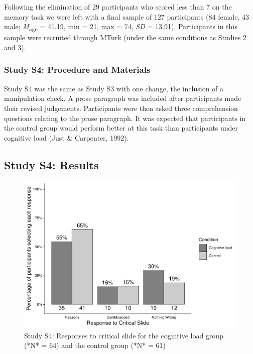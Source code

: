 \documentclass[
  american,
  man,floatsintext]{apa7}
\begin{document}
Following the elimination of 29 participants who scored less than 7 on the memory task we were left with a final sample of 127 participants (84 female, 43 male; \emph{M}\textsubscript{age} = 41.19, min = 21, max = 74, \emph{SD} = 13.91). Participants in this sample were recruited through
MTurk (under the same conditions as Studies 2 and 3).

\hypertarget{study-s4-procedure-and-materials}{%
\subsubsection{Study S4: Procedure and Materials}\label{study-s4-procedure-and-materials}}

Study S4 was the same as Study S3 with one change, the inclusion of a manipulation check. A prose paragraph was included after participants made their revised judgements. Participants were then asked three comprehension questions relating to the prose paragraph. It was expected that participants in the control group would perform better at this task than participants under cognitive load (Just \& Carpenter, 1992).

\hypertarget{study-s4-results}{%
\subsection{Study S4: Results}\label{study-s4-results}}

\begin{figure}[!h]
\includegraphics{Supplementary_files/figure-latex/ch5S4fig2criticalcondition-1} \caption{Study S4: Responses to critical slide for the cognitive load group (*N* = 64) and the control group (*N* = 61)}\label{fig:ch5S4fig2criticalcondition}
\end{figure}
\end{document}
